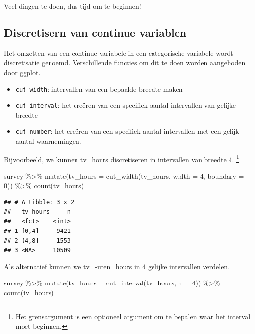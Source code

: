 \documentclass[]{tufte-book}
\newenvironment{Shaded}{}{}
\newcommand{\AttributeTok}[1]{\textcolor[rgb]{0.49,0.56,0.16}{#1}}
\newcommand{\DecValTok}[1]{\textcolor[rgb]{0.25,0.63,0.44}{#1}}
\newcommand{\FunctionTok}[1]{\textcolor[rgb]{0.02,0.16,0.49}{#1}}
\newcommand{\NormalTok}[1]{#1}
\newcommand{\SpecialCharTok}[1]{\textcolor[rgb]{0.25,0.44,0.63}{#1}}
\providecommand{\tightlist}{%
  \setlength{\itemsep}{0pt}\setlength{\parskip}{0pt}}
\begin{document}
Veel dingen te doen, dus tijd om te beginnen!

\hypertarget{discretisern-van-continue-variablen}{%
\subsection{Discretisern van continue variablen}\label{discretisern-van-continue-variablen}}

Het omzetten van een continue variabele in een categorische variabele wordt discretisatie genoemd. Verschillende functies om dit te doen worden aangeboden door ggplot.

\begin{itemize}
\tightlist
\item
  \texttt{cut\_width}: intervallen van een bepaalde breedte maken
\item
  \texttt{cut\_interval}: het creëren van een specifiek aantal intervallen van gelijke breedte
\item
  \texttt{cut\_number}: het creëren van een specifiek aantal intervallen met een gelijk aantal waarnemingen.
\end{itemize}

Bijvoorbeeld, we kunnen tv\_hours discretiseren in intervallen van breedte 4. \footnote{Het grensargument is een optioneel argument om te bepalen waar het interval moet beginnen.}

\begin{Shaded}
\begin{Highlighting}[]
\NormalTok{survey }\SpecialCharTok{\%\textgreater{}\%}
  \FunctionTok{mutate}\NormalTok{(}\AttributeTok{tv\_hours =} \FunctionTok{cut\_width}\NormalTok{(tv\_hours, }\AttributeTok{width =} \DecValTok{4}\NormalTok{, }\AttributeTok{boundary =} \DecValTok{0}\NormalTok{)) }\SpecialCharTok{\%\textgreater{}\%}
  \FunctionTok{count}\NormalTok{(tv\_hours)}
\end{Highlighting}
\end{Shaded}

\begin{verbatim}
## # A tibble: 3 x 2
##   tv_hours     n
##   <fct>    <int>
## 1 [0,4]     9421
## 2 (4,8]     1553
## 3 <NA>     10509
\end{verbatim}

Als alternatief kunnen we tv\_-uren\_hours in 4 gelijke intervallen verdelen.

\begin{Shaded}
\begin{Highlighting}[]
\NormalTok{survey }\SpecialCharTok{\%\textgreater{}\%}
  \FunctionTok{mutate}\NormalTok{(}\AttributeTok{tv\_hours =} \FunctionTok{cut\_interval}\NormalTok{(tv\_hours, }\AttributeTok{n =} \DecValTok{4}\NormalTok{)) }\SpecialCharTok{\%\textgreater{}\%}
  \FunctionTok{count}\NormalTok{(tv\_hours)}
\end{Highlighting}
\end{Shaded}
\end{document}
